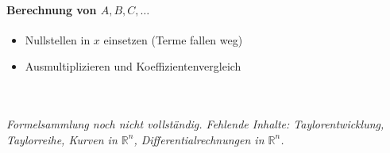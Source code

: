 \documentclass[6pt,a4paper]{scrartcl}
\begin{document}
\begin{multicols*}{4}
\paragraph{Berechnung von $A,B,C,\dots$}
\begin{itemize}\itemsep0pt
\item Nullstellen in $x$ einsetzen (Terme fallen weg)
\item Ausmultiplizieren und Koeffizientenvergleich
\end{itemize}

\ \\\\
\textit{Formelsammlung noch nicht vollständig. Fehlende Inhalte: Taylorentwicklung, Taylorreihe, Kurven in $\mathbb{R}^n$, Differentialrechnungen in $\mathbb{R}^n$.}



\end{multicols*}


\end{document}
